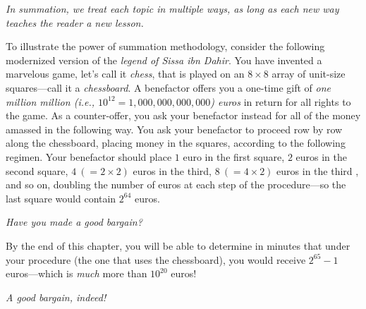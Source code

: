 {\em In summation, we treat each topic in multiple ways, as long as
  each new way teaches the reader a new lesson.}

\bigskip








To illustrate the power of summation methodology, consider the
following modernized version of the {\it legend of Sissa ibn Dahir}.
You have invented a marvelous game, let's call it {\it chess}, that is
played on an $8 \times 8$ array of unit-size squares---call it a {\it
  chessboard}.  A benefactor offers you a one-time gift of {\em one
  million million (i.e., $10^{12} = 1,000,000,000,000$) euros} in
return for all rights to the game.  As a counter-offer, you ask your
benefactor instead for all of the money amassed in the following way.
You ask your benefactor to proceed row by row along the chessboard,
placing money in the squares, according to the following regimen.
Your benefactor should place $1$ euro in the first square, $2$ euros
in the second square, $4 \ (= 2 \times 2)$ euros in the third, $8 \ (=
4 \times 2)$ euros in the third , and so on, doubling the number of
euros at each step of the procedure---so the last square would contain
$2^{64}$ euros.

\noindent
{\em Have you made a good bargain?}

\medskip

By the end of this chapter, you will be able to determine in minutes
that under your procedure (the one that uses the chessboard), you
would receive $2^{65} -1$ euros---which is {\em much} more than
$10^{20}$ euros!

\noindent
{\em A good bargain, indeed!}



